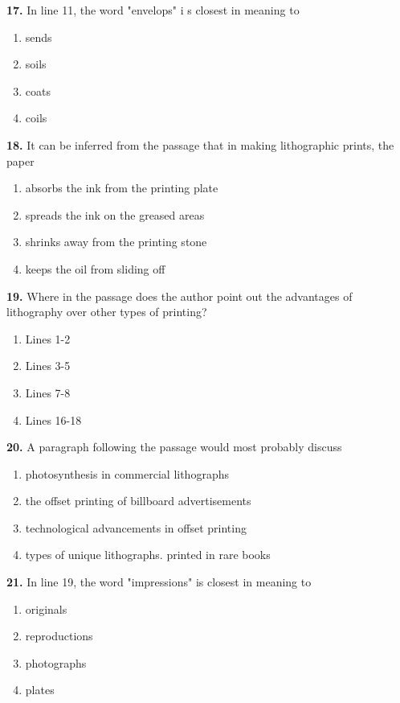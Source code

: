 \documentclass[12pt]{article}
\begin{document}
\vspace{0.25\baselineskip}
\noindent\textbf{17.} In line 11, the word "envelops" i s closest in meaning to
\begin{enumerate}[label=(\Alph*),leftmargin=*,itemsep=0.2em]
\item sends
\item soils
\item coats
\item coils
\end{enumerate}
\par
\vspace{0.25\baselineskip}
\noindent\textbf{18.} It can be inferred from the passage that in making lithographic prints, the paper
\begin{enumerate}[label=(\Alph*),leftmargin=*,itemsep=0.2em]
\item absorbs the ink from the printing plate
\item spreads the ink on the greased areas
\item shrinks away from the printing stone
\item keeps the oil from sliding off
\end{enumerate}
\par
\vspace{0.25\baselineskip}
\noindent\textbf{19.} Where in the passage does the author point out the advantages of lithography over other types of printing?
\begin{enumerate}[label=(\Alph*),leftmargin=*,itemsep=0.2em]
\item Lines 1-2
\item Lines 3-5
\item Lines 7-8
\item Lines 16-18
\end{enumerate}
\par
\vspace{0.25\baselineskip}
\noindent\textbf{20.} A paragraph following the passage would most probably discuss
\begin{enumerate}[label=(\Alph*),leftmargin=*,itemsep=0.2em]
\item photosynthesis in commercial lithographs
\item the offset printing of billboard advertisements
\item technological advancements in offset printing
\item types of unique lithographs. printed in rare books
\end{enumerate}
\par
\vspace{0.25\baselineskip}
\noindent\textbf{21.} In line 19, the word "impressions" is closest in meaning to
\begin{enumerate}[label=(\Alph*),leftmargin=*,itemsep=0.2em]
\item originals
\item reproductions
\item photographs
\item plates
\end{enumerate}
\par
\vspace{0.25\baselineskip}
\end{document}
